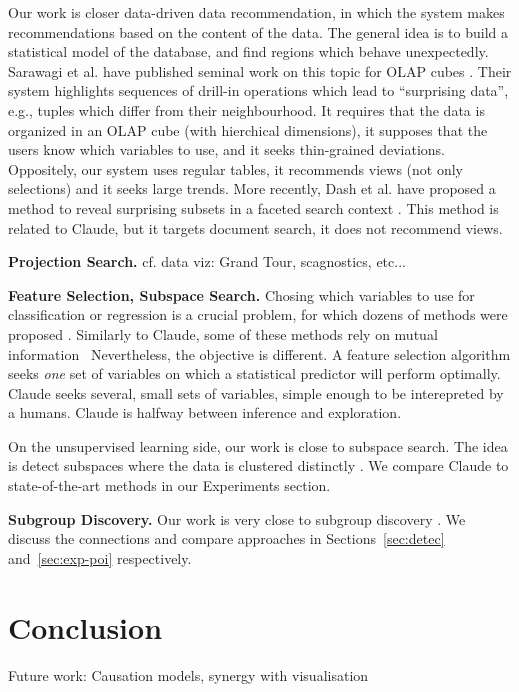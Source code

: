 Our work is closer data-driven data recommendation, in which the system makes
recommendations based on the content of the data. The general idea is to build
a statistical model of the database, and find regions which behave
unexpectedly. Sarawagi et al. have published seminal work on this topic for
OLAP cubes \cite{sarawagi1998discovery}. Their system highlights sequences of
drill-in operations which lead to ``surprising data'', e.g., tuples which
differ from their neighbourhood. It requires that the data is organized in an
OLAP cube (with hierchical dimensions), it supposes that the users know which
variables to use, and it seeks thin-grained deviations. Oppositely, our system
uses regular tables, it recommends views (not only selections) and it seeks
large trends. More recently, Dash et al. have proposed a method to reveal
surprising subsets in a faceted search context \cite{dash2008dynamic}. This
method is related to Claude, but it targets document search, it does not
recommend views.

\textbf{Projection Search.} cf. data viz: Grand Tour, scagnostics, etc...


\textbf{Feature Selection, Subspace Search.} Chosing which variables to use for
classification or regression is a crucial problem, for which dozens of methods
were proposed \cite{guyon2003introduction}. Similarly to Claude, some of these
methods rely on mutual information~\cite{peng2005feature} Nevertheless, the
objective is different. A feature selection algorithm seeks \emph{one} set of
variables on which a statistical predictor will perform optimally. Claude seeks
several, small sets of variables, simple enough to be interepreted by a humans.
Claude is halfway between inference and exploration.

On the unsupervised learning side, our work is close to subspace search. The
idea is detect subspaces where the data is clustered distinctly
\cite{keller2012hics,nguyen20134s}. We compare Claude to state-of-the-art
methods in our Experiments section.

\textbf{Subgroup Discovery.} Our work is very close to subgroup discovery
\cite{klosgen1996explora, wrobel1997algorithm, van2011non}. We discuss the
connections and compare approaches in Sections~\ref{sec:detec}
and~\ref{sec:exp-poi} respectively.

\section{Conclusion}

Future work: Causation models, synergy with visualisation
